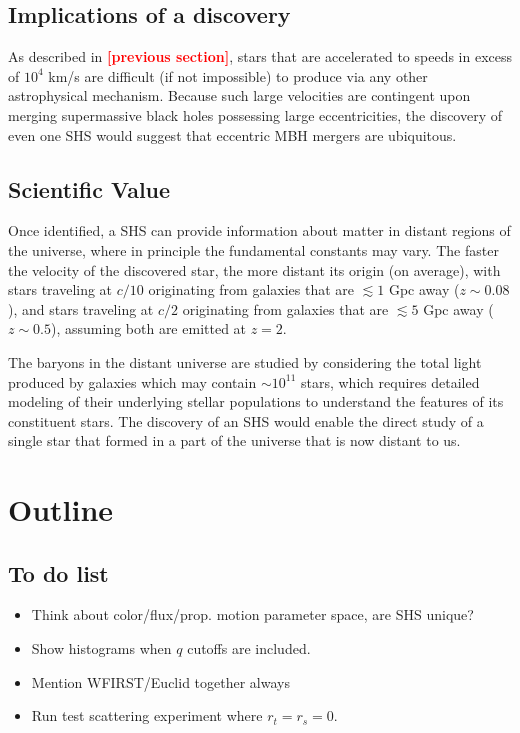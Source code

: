 \documentclass[a4paper,twocolumn]{emulateapj}
\newcommand{\colr}[1]{{\bf \textcolor{red}{[#1]}}}
\begin{document}
\subsection{Implications of a discovery}
As described in \colr{previous section}, stars that are accelerated to speeds in excess of $10^{4}$ km/s are difficult (if not impossible) to produce via any other astrophysical mechanism. Because such large velocities are contingent upon merging supermassive black holes possessing large eccentricities, the discovery of even one SHS would suggest that eccentric MBH mergers are ubiquitous.

\subsection{Scientific Value}
Once identified, a SHS can provide information about matter in distant regions of the universe, where in principle the fundamental constants may vary. The faster the velocity of the discovered star, the more distant its origin (on average), with stars traveling at $c/10$ originating from galaxies that are $\lesssim 1$ Gpc away ($z \sim 0.08$), and stars traveling at $c/2$ originating from galaxies that are $\lesssim 5$ Gpc away ($z \sim 0.5$), assuming both are emitted at $z = 2$.

The baryons in the distant universe are studied by considering the total light produced by galaxies which may contain $\sim 10^{11}$ stars, which requires detailed modeling of their underlying stellar populations to understand the features of its constituent stars. The discovery of an SHS would enable the direct study of a single star that formed in a part of the universe that is now distant to us. 

\section{Outline}
\subsection{To do list}
\begin{itemize}
\item Think about color/flux/prop. motion parameter space, are SHS unique?
\item Show histograms when $q$ cutoffs are included.
\item Mention WFIRST/Euclid together always
\item Run test scattering experiment where $r_{t} = r_{s} = 0$.
\end{itemize}
\end{document}
